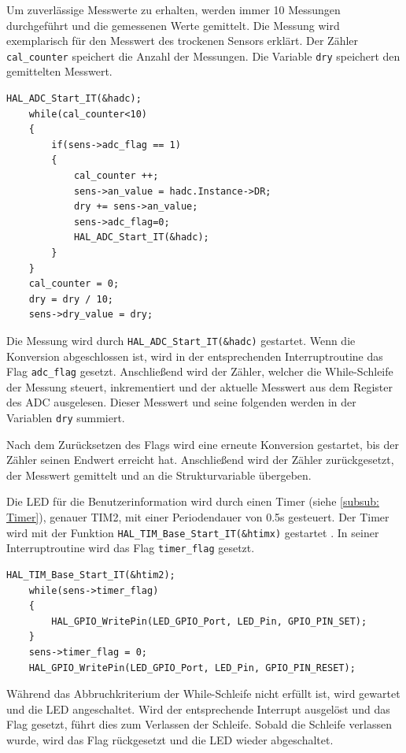   Um zuverlässige Messwerte zu erhalten, werden immer 10 Messungen durchgeführt und die gemessenen Werte gemittelt. Die Messung wird exemplarisch für den Messwert des
  trockenen Sensors erklärt. Der Zähler \lstinline!cal_counter! speichert die Anzahl der Messungen. Die Variable \lstinline!dry! speichert den gemittelten Messwert.
  
  \newpage
  
  \begin{lstlisting}[caption={\textit{Kalibrationsroutine}}]
    HAL_ADC_Start_IT(&hadc);
    while(cal_counter<10)								
    {
	    if(sens->adc_flag == 1)
        {
            cal_counter ++;
            sens->an_value = hadc.Instance->DR;
            dry += sens->an_value;
            sens->adc_flag=0;
            HAL_ADC_Start_IT(&hadc);
        }
    }
    cal_counter = 0;
    dry = dry / 10;			
    sens->dry_value = dry;
  \end{lstlisting}

  Die Messung wird durch \lstinline!HAL_ADC_Start_IT(&hadc)! gestartet. Wenn die Konversion abgeschlossen ist, wird in der entsprechenden Interruptroutine das Flag 
  \lstinline!adc_flag! gesetzt. Anschließend wird der Zähler, welcher die While-Schleife der Messung steuert, inkrementiert und der aktuelle Messwert aus dem Register
  des \ac{ADC} ausgelesen. Dieser Messwert und seine folgenden werden in der Variablen \lstinline!dry! summiert. 

  \smallskip

  Nach dem Zurücksetzen des Flags wird eine erneute Konversion gestartet, bis der Zähler seinen Endwert erreicht hat. Anschließend wird der Zähler zurückgesetzt, der Messwert
  gemittelt und an die Strukturvariable übergeben.

  \smallskip

  Die LED für die Benutzerinformation wird durch einen Timer (siehe \ref{subsub: Timer}), genauer TIM2, mit einer Periodendauer von 0.5s gesteuert. Der Timer wird mit
  der Funktion \lstinline!HAL_TIM_Base_Start_IT(&htimx)! gestartet \citep{HAL_Description}. In seiner Interruptroutine wird das Flag \lstinline!timer_flag! gesetzt. 
  \begin{lstlisting}[caption={\textit{LED Timer}}]
    HAL_TIM_Base_Start_IT(&htim2);								 
    while(sens->timer_flag)
    {
        HAL_GPIO_WritePin(LED_GPIO_Port, LED_Pin, GPIO_PIN_SET);
    }
    sens->timer_flag = 0; 												
    HAL_GPIO_WritePin(LED_GPIO_Port, LED_Pin, GPIO_PIN_RESET);
  \end{lstlisting} 
  Während das Abbruchkriterium der While-Schleife nicht erfüllt ist, wird gewartet und die LED angeschaltet. Wird der entsprechende Interrupt ausgelöst und das Flag gesetzt, führt dies 
  zum Verlassen der Schleife. Sobald die Schleife verlassen wurde, wird das Flag rückgesetzt und die LED wieder abgeschaltet.

